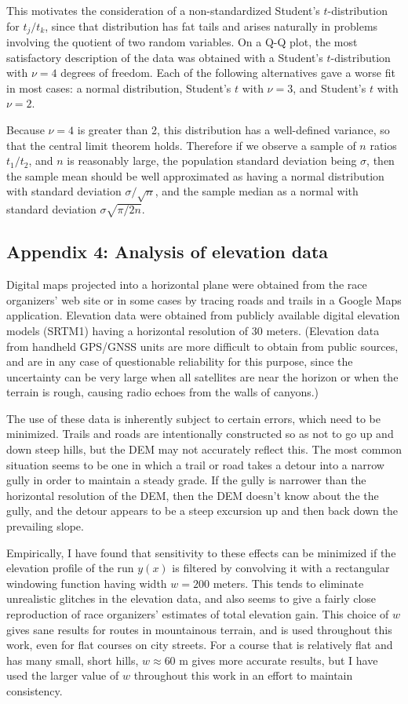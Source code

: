 \documentclass[10pt,letterpaper]{article}
\begin{document}
This motivates the consideration of a non-standardized Student's $t$-distribution for $t_j/t_k$, since that
distribution has fat tails and arises naturally in problems involving the quotient of two random variables.
On a Q-Q plot, the most satisfactory description of the data was obtained with a Student's
$t$-distribution with $\nu=4$ degrees of freedom.
Each of the following alternatives gave a worse fit in most cases: a normal distribution,
Student's $t$ with $\nu=3$, and Student's $t$ with $\nu=2$.

Because $\nu=4$ is greater than 2, this distribution has a well-defined variance, so that
the central limit theorem holds. Therefore if we observe a sample of $n$ ratios $t_1/t_2$,
and $n$ is reasonably large,
the population standard deviation being $\sigma$, then the sample mean should be well
approximated as having a normal distribution with standard deviation $\sigma/\sqrt{n}$,
and the sample median as a normal with standard deviation $\sigma\sqrt{\pi/2n}$.

\subsection*{Appendix 4: Analysis of elevation data}
Digital maps projected into a horizontal plane were obtained from the race organizers' web site
or in some cases by tracing roads and trails in a Google Maps application. Elevation data
were obtained from publicly available digital elevation models (SRTM1) having a horizontal
resolution of 30 meters. (Elevation data from handheld GPS/GNSS units are more difficult to
obtain from public sources, and are in any case of questionable reliability
for this purpose, since the uncertainty can be very large when all satellites are near the
horizon or when the terrain is rough, causing radio echoes from the walls of canyons.)

The use of these data is inherently subject to certain errors, which need to be minimized.
Trails and roads are intentionally constructed so as not to go up and down steep hills, but
the DEM may not accurately reflect this. The most common situation seems to be one in which
a trail or road takes a detour into a narrow gully in order to maintain a steady grade.
If the gully is narrower than the horizontal resolution of the DEM, then the DEM doesn't know about the the gully, and
the detour appears to be a steep excursion up and then back down the prevailing slope.

Empirically, I have found that sensitivity to these effects can be minimized if the elevation
profile of the run $y(x)$ is filtered by convolving it with a rectangular windowing function having width
$w=200$ meters. This tends to eliminate unrealistic glitches in the elevation data, and also seems to give
a fairly close reproduction of race organizers' estimates of total elevation gain. This choice of $w$ gives
sane results for routes in mountainous terrain, and is used throughout this work, even for flat courses
on city streets. For a course that is relatively flat and has many small, short hills, $w\approx60$ m gives
more accurate results, but I have used the larger value of $w$ throughout this work in an effort to maintain
consistency.
\end{document}
